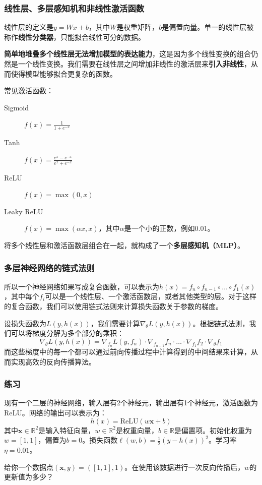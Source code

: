 \documentclass[aspectratio=1610]{ctexbeamer}
\begin{document}
\begin{frame}
    \frametitle{线性层、多层感知机和非线性激活函数}

    线性层的定义是$y = Wx + b$，其中$W$是权重矩阵，$b$是偏置向量。单一的线性层被称作\textbf{线性分类器}，只能拟合线性可分的数据。

    \textbf{简单地堆叠多个线性层无法增加模型的表达能力}，这是因为多个线性变换的组合仍然是一个线性变换。我们需要在线性层之间增加非线性的激活层来\textbf{引入非线性}，从而使得模型能够拟合更复杂的函数。    
    
    \vspace{1em}

    常见激活函数：
    \begin{description}
        \item[Sigmoid] $f(x) = \frac{1}{1 + e^{-x}}$
        \item[Tanh] $f(x) = \frac{e^x - e^{-x}}{e^x + e^{-x}}$
        \item[ReLU] $f(x) = \max(0, x)$
        \item[Leaky ReLU] $f(x) = \max(\alpha x, x)$，其中$\alpha$是一个小的正数，例如0.01。 
    \end{description}

    \vspace{1em}
    将多个线性层和激活函数层组合在一起，就构成了一个\textbf{多层感知机（MLP）}。

\end{frame}

\begin{frame}
    \frametitle{多层神经网络的链式法则}

    所以一个神经网络如果写成复合函数，可以表示为$h(x) = f_n \circ f_{n-1} \circ \ldots \circ f_1(x)$，其中每个$f_i$可以是一个线性层、一个激活函数层，或者其他类型的层。对于这样的复合函数，我们可以使用链式法则来计算损失函数关于参数的梯度。

    设损失函数为$L(y, h(x))$，我们需要计算$\nabla_\theta L(y, h(x))$。根据链式法则，我们可以将梯度分解为多个部分的乘积：
\begin{equation}
\nabla_\theta L(y, h(x)) = \nabla_{f_n} L(y, f_n) \cdot \nabla_{f_{n-1}} f_n \cdot \ldots \cdot \nabla_{f_1} f_2 \cdot \nabla_\theta f_1
\end{equation}
而这些梯度中的每一个都可以通过前向传播过程中计算得到的中间结果来计算，从而实现高效的反向传播算法。

\end{frame}

\begin{frame}
    \frametitle{练习}

    现有一个二层的神经网络，输入层有2个神经元，输出层有1个神经元，激活函数为ReLU。网络的输出可以表示为：
    \[ h(x) = \text{ReLU}(w\mathbf{x} + b) \]
其中$\mathbf{x}\in \mathbb{R}^2$是输入特征向量，$w \in \mathbb{R}^2$是权重向量，$b \in \mathbb{R}$是偏置项。初始化权重为$w = [1, 1]$，偏置为$b = 0$。损失函数$\ell(w, b) = \frac{1}{2}(y - h(x))^2$。学习率$\eta = 0.01$。

给你一个数据点$(\mathbf{x}, y) = ([1, 1], 1)$。在使用该数据进行一次反向传播后，$w$的更新值为多少？

\end{frame}
\end{document}
